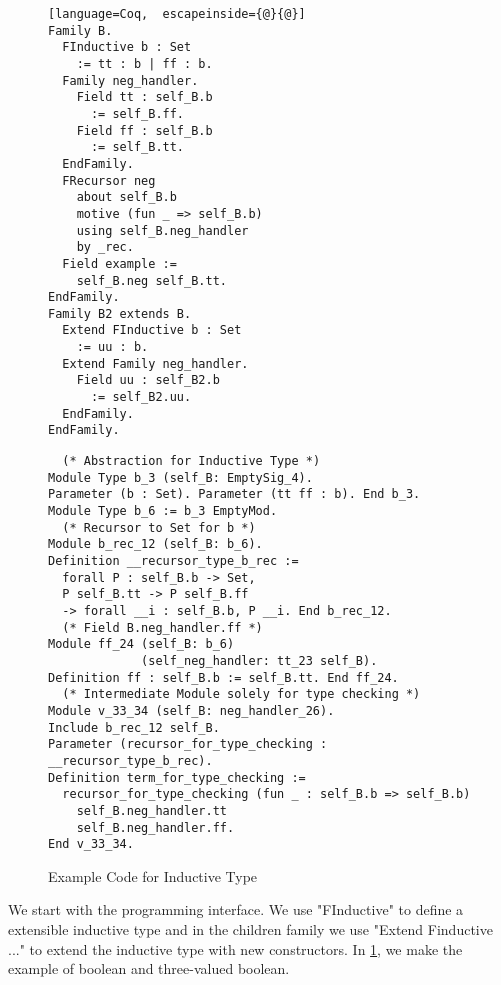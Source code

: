 \begin{figure}[!htb]
  \begin{minipage}[t]{0.32\linewidth}
\begin{lstlisting}[language=Coq,  escapeinside={@}{@}]
Family B.
  FInductive b : Set 
    := tt : b | ff : b.
  Family neg_handler. 
    Field tt : self_B.b 
      := self_B.ff.
    Field ff : self_B.b 
      := self_B.tt.
  EndFamily.
  FRecursor neg 
    about self_B.b 
    motive (fun _ => self_B.b)
    using self_B.neg_handler
    by _rec.
  Field example := 
    self_B.neg self_B.tt. 
EndFamily.
Family B2 extends B.
  Extend FInductive b : Set 
    := uu : b.
  Extend Family neg_handler.
    Field uu : self_B2.b 
      := self_B2.uu.
  EndFamily. 
EndFamily.
\end{lstlisting}
  \end{minipage}
  \begin{minipage}[t]{0.65\linewidth}
\begin{verbatim}
  (* Abstraction for Inductive Type *)
Module Type b_3 (self_B: EmptySig_4).
Parameter (b : Set). Parameter (tt ff : b). End b_3.      
Module Type b_6 := b_3 EmptyMod.
  (* Recursor to Set for b *)
Module b_rec_12 (self_B: b_6).
Definition __recursor_type_b_rec :=
  forall P : self_B.b -> Set,
  P self_B.tt -> P self_B.ff 
  -> forall __i : self_B.b, P __i. End b_rec_12. 
  (* Field B.neg_handler.ff *)
Module ff_24 (self_B: b_6) 
             (self_neg_handler: tt_23 self_B).
Definition ff : self_B.b := self_B.tt. End ff_24.
  (* Intermediate Module solely for type checking *)
Module v_33_34 (self_B: neg_handler_26).
Include b_rec_12 self_B.
Parameter (recursor_for_type_checking : __recursor_type_b_rec).
Definition term_for_type_checking :=
  recursor_for_type_checking (fun _ : self_B.b => self_B.b)
    self_B.neg_handler.tt
    self_B.neg_handler.ff.  
End v_33_34.
\end{verbatim}
  \end{minipage}
\caption{Example Code for Inductive Type}\label{fig:plugin-example2}
\end{figure}



We start with the programming interface. We use "FInductive" to define a extensible inductive type and in the children family we use "Extend Finductive ..." to extend the inductive type with new constructors. In \cref{fig:plugin-example2}, we make the example of boolean and three-valued boolean. 



